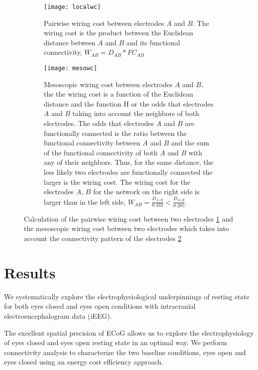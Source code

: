 \documentclass[11pt, onecolumn]{article}
\begin{document}
\begin{figure}[ht] 
  \begin{subfigure}[t]{0.5\linewidth}
    \centering
    \texttt{[image: localwc]} 
    \caption{Pairwise wiring cost between electrodes $A$ and $B$. The wiring cost is the product between the Euclidean distance between $A$ and $B$ and its functional connectivity, $W_{AB} = D_{AB} * FC_{AB}$} 
    \label{fig:wca} 
    \vspace{4ex}
  \end{subfigure}%
  \hspace{1ex}
  \begin{subfigure}[t]{0.5\linewidth}
    \centering
    \texttt{[image: mesowc]} 
    \caption{Mesoscopic wiring cost between electrodes $A$ and $B$, the the wiring cost is a function of the Euclidean distance and the function H or the odds that electrodes $A$ and $B$ taking into account the neighbors of both electrodes. The odds that electrodes $A$ and $B$ are functionally connected is the ratio between the functional connectivity between $A$ and $B$ and the sum of the functional connectivity of both $A$ and $B$ with any of their neighbors. Thus, for the same distance, the less likely two electrodes are functionally connected the larger is the wiring cost. The wiring cost for the electrodes $A$, $B$ for the network on the right side is larger than in the left side, $W_{AB} = \frac{D_{A,B}}{0.432} <  \frac{D_{A,B}}{0.285}$.} 
    \label{fig:wcb} 
    \vspace{4ex}
  \end{subfigure} 
  \caption{Calculation of the pairwise wiring cost between two electrodes \ref{fig:wca} and the mesoscopic wiring cost between two electrodes which takes into account the connectivity pattern of the electrodes \ref{fig:wcb} }
  \label{fig:wc} 
\end{figure}

\section{Results}
We systematically explore the electrophysiological underpinnings of resting state for both eyes closed and eyes open conditions with intracranial electroencephalogram data (iEEG).

The excellent spatial precision of ECoG allows us to explore the electrophysiology of eyes closed and eyes open resting state in an optimal way. 
We perform connectivity analysis to characterize the two baseline conditions, eyes open and eyes closed using an energy cost efficiency approach. 
\end{document}
